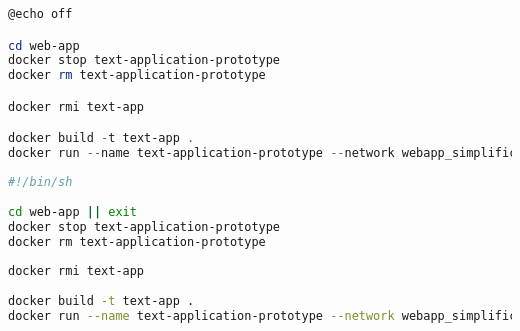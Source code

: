 \begin{lstlisting}[language=Powershell, caption={Script voor het opstarten van de Docker-container voor Windows-gebruikers}, label={code:shell-boot}]
@echo off

cd web-app
docker stop text-application-prototype
docker rm text-application-prototype

docker rmi text-app

docker build -t text-app .
docker run --name text-application-prototype --network webapp_simplification -d -p 5000:5000 text-app
\end{lstlisting}

\begin{lstlisting}[language=Bash, caption={Script voor het opstarten van de Docker-container voor Unix-gebruikers}, label={code:bash-boot}]
#!/bin/sh
	
cd web-app || exit
docker stop text-application-prototype
docker rm text-application-prototype
	
docker rmi text-app
	
docker build -t text-app .
docker run --name text-application-prototype --network webapp_simplification -d -p 5000:5000 text-app
\end{lstlisting}